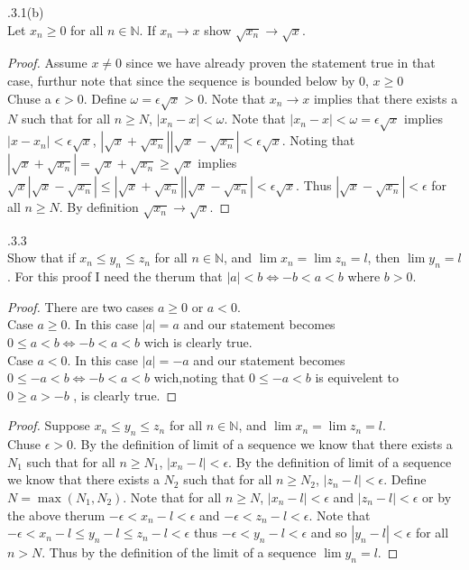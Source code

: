 \documentclass[12pt]{article}
\makeatletter
\theoremstyle{homework}
\newenvironment{exercise}[1]
{\def\@currentlabel{#1}\exercisecore}
{\endexercisecore}
\makeatother
\begin{document}
\begin{exercise}

2.3.1(b)\\
Let $x_n\geq 0$ for all $n\in\mathbb{N}$.  If $x_n\rightarrow x$ show $\sqrt{x_n}\rightarrow \sqrt{x}$.
\end{exercise}
\begin{proof}
Assume $x\neq0$ since we have already proven the statement true in that case, furthur note that since the sequence is bounded below by $0$, $x\geq 0$\\
Chuse a $\epsilon>0$.  Define $\omega=\epsilon \sqrt{x}>0$.  Note that $x_n\rightarrow x$ implies that there exists a $N$ such that for all $n\geq N$, $|x_n-x|<\omega$.  Note that $|x_n-x|<\omega=\epsilon \sqrt{x}$ implies $|x-x_n|<\epsilon \sqrt{x}$, $|\sqrt{x}+\sqrt{x_n}||\sqrt{x}-\sqrt{x_n}|<\epsilon \sqrt{x}$.  Noting that $|\sqrt{x}+\sqrt{x_n}|=\sqrt{x}+\sqrt{x_n}\geq \sqrt{x}$ implies $\sqrt{x}|\sqrt{x}-\sqrt{x_n}| \leq|\sqrt{x}+\sqrt{x_n}||\sqrt{x}-\sqrt{x_n}|<\epsilon \sqrt{x}$.  Thus $|\sqrt{x}-\sqrt{x_n}|<\epsilon$ for all $n\geq N$.  By definition $\sqrt{x_n}\rightarrow \sqrt{x}$.
\end{proof}

\begin{exercise}

2.3.3\\
Show that if $x_n\leq y_n\leq z_n$ for all $n\in\mathbb{N}$, and $\lim x_n=\lim z_n=l$, then $\lim y_n=l$.
\end{exercise}
For this proof I need the therum that $|a|<b\Leftrightarrow -b<a<b$ where $b>0$.
\begin{proof}
There are two cases $a\geq 0$ or $a<0$.\\
Case $a\geq 0$.  In this case $|a|=a$ and our statement becomes $0\leq a<b\Leftrightarrow -b<a<b$ wich is clearly true.\\
Case $a< 0$.  In this case $|a|=-a$ and our statement becomes $0\leq -a<b\Leftrightarrow -b<a<b$ wich,noting that $0\leq -a<b$ is equivelent to $0\geq a>-b$ , is clearly true.
\end{proof}
\begin{proof}
Suppose $x_n\leq y_n\leq z_n$ for all $n\in\mathbb{N}$, and $\lim x_n=\lim z_n=l$.\\
Chuse $\epsilon>0$.  By the definition of limit of a sequence we know that there exists a $N_1$ such that for all $n\geq N_1$, $|x_n-l|<\epsilon$.  By the definition of limit of a sequence we know that there exists a $N_2$ such that for all $n\geq N_2$, $|z_n-l|<\epsilon$.  Define $N=\max(N_1,N_2)$.  Note that for all $n\geq N$, $|x_n-l|<\epsilon$ and $|z_n-l|<\epsilon$ or by the above therum $-\epsilon< x_n-l<\epsilon$ and $-\epsilon< z_n-l<\epsilon$.  Note that $-\epsilon<x_n-l\leq y_n-l\leq z_n-l<\epsilon$ thus $-\epsilon<y_n-l<\epsilon$ and so $|y_n-l|<\epsilon$ for all $n>N$.  Thus by the definition of the limit of a sequence $\lim y_n=l$.
\end{proof}
\end{document}
